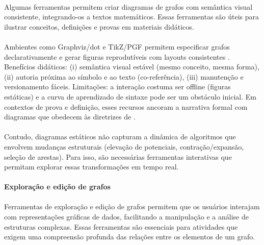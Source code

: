 \documentclass[12pt,a4paper]{article}
\begin{document}
\paragraph{}
Algumas ferramentas permitem criar diagramas de grafos com semântica visual consistente, integrando-os a textos matemáticos. Essas ferramentas são úteis para ilustrar conceitos, definições e provas em materiais didáticos.

\paragraph{}
Ambientes como Graphviz/dot e TikZ/PGF permitem especificar grafos declarativamente e gerar figuras reprodutíveis com layouts consistentes \cite{graphviz,tantau2015tikz}. Benefícios didáticos: (i) semântica visual estável (mesmo conceito, mesma forma), (ii) autoria próxima ao símbolo e ao texto (co-referência), (iii) manutenção e versionamento fáceis. Limitações: a interação costuma ser offline (figuras estáticas) e a curva de aprendizado de sintaxe pode ser um obstáculo inicial. Em contextos de prova e definição, esses recursos ancoram a narrativa formal com diagramas que obedecem às diretrizes de \cite{larkin1987diagram,ware2012information}.

\paragraph{}
Contudo, diagramas estáticos não capturam a dinâmica de algoritmos que envolvem mudanças estruturais (elevação de potenciais, contração/expansão, seleção de arestas). Para isso, são necessárias ferramentas interativas que permitam explorar essas transformações em tempo real.

\paragraph{Exploração e edição de grafos}
\paragraph{}
Ferramentas de exploração e edição de grafos permitem que os usuários interajam com representações gráficas de dados, facilitando a manipulação e a análise de estruturas complexas. Essas ferramentas são essenciais para atividades que exigem uma compreensão profunda das relações entre os elementos de um grafo.
\end{document}
